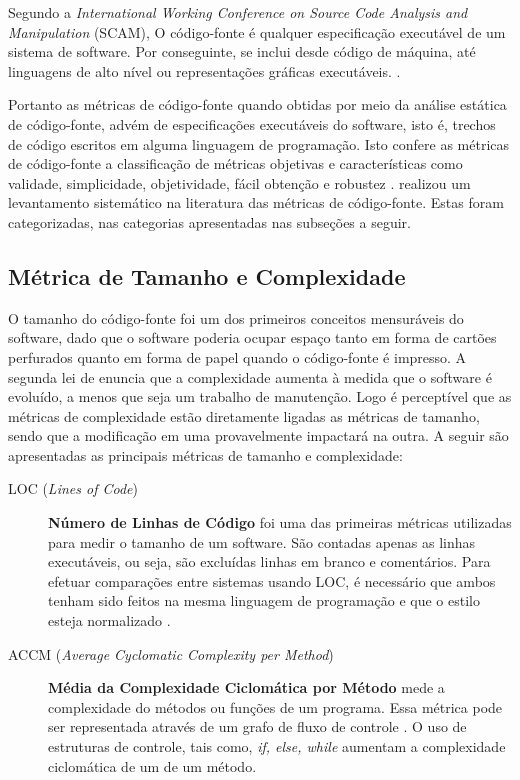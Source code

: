 Segundo a \textit{International Working Conference on Source Code Analysis and 
Manipulation} (SCAM), O código-fonte é qualquer especificação executável 
de um sistema de software. Por conseguinte, se inclui desde código de máquina, 
até linguagens de alto nível ou representações gráficas executáveis. 
\cite{harman2010source}. 


Portanto as métricas de código-fonte quando obtidas por meio da análise estática de código-fonte, advém de especificações executáveis do software, isto é, trechos de código escritos em alguma linguagem de programação. Isto confere as métricas de código-fonte a classificação de métricas objetivas e características como validade, simplicidade, objetividade, fácil obtenção e robustez \cite{Mills:1999}.  realizou um levantamento sistemático na literatura das métricas de código-fonte. Estas foram categorizadas, nas categorias apresentadas nas subseções a seguir. 


\subsection{Métrica de Tamanho e Complexidade}

\label{métricas tamanho e complexidade} 

O tamanho do código-fonte foi um dos primeiros conceitos mensuráveis do 
software, dado que o software poderia ocupar espaço tanto em forma de cartões 
perfurados quanto em forma de papel quando o código-fonte é impresso. 
A segunda lei de  enuncia que a complexidade aumenta à 
medida que o software é evoluído, a menos que seja um trabalho de manutenção. 
Logo é perceptível que as métricas de complexidade estão diretamente ligadas as 
métricas de tamanho, sendo que a modificação em uma provavelmente impactará na 
outra. A seguir são apresentadas as principais métricas de tamanho e 
complexidade:


\begin{description}

	\item[LOC (\textit{Lines of Code})] \textbf{Número de Linhas de Código} 
	foi uma das primeiras métricas utilizadas para medir o tamanho de um 
	software. São contadas apenas as linhas executáveis, ou seja, são excluídas 
	linhas em branco e comentários. Para efetuar comparações entre sistemas 
	usando LOC, é necessário que ambos tenham sido feitos na mesma linguagem de 
	programação e que o estilo esteja normalizado \cite{Jones91}.
	
	\item[ACCM (\textit{Average Cyclomatic Complexity per Method})] \textbf{
	Média da Complexidade Ciclomática por Método} mede a complexidade do 
	métodos ou funções de um programa. Essa métrica pode ser representada 
	através de um grafo de fluxo de controle \cite{McCabe76}. O uso de 
	estruturas de controle, tais como, \textit{if, else, while} aumentam a 
	complexidade ciclomática de um de um método.

\end{description}




